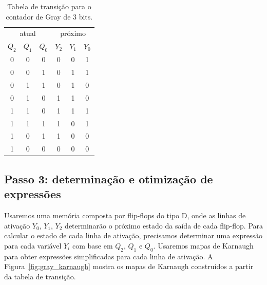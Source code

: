 \documentclass[a4paper]{article}
\begin{document}
\begin{table}[!htp]
\begin{center}
\caption{Tabela de transição para o contador de Gray de $3$ bits.}
\label{tab:gray}
\begin{tabular}{|ccc||ccc|}
\hline
\multicolumn{3}{|c||}{atual} &
\multicolumn{3}{c|}{próximo} \\
$Q_2$ & $Q_1$ & $Q_0$  & $Y_2$ & $Y_1$ & $Y_0$ \\
\hline
  0   &   0   &   0    &   0   &   0   &   1   \\ 
  0   &   0   &   1    &   0   &   1   &   1   \\ 
  0   &   1   &   1    &   0   &   1   &   0   \\ 
  0   &   1   &   0    &   1   &   1   &   0   \\ 
  1   &   1   &   0    &   1   &   1   &   1   \\ 
  1   &   1   &   1    &   1   &   0   &   1   \\ 
  1   &   0   &   1    &   1   &   0   &   0   \\ 
  1   &   0   &   0    &   0   &   0   &   0   \\
\hline
\end{tabular}
\end{center}
\end{table}

\subsection{Passo 3: determinação e otimização de expressões}

Usaremos uma memória composta por flip-flops do tipo D,
onde as linhas de ativação $Y_0$, $Y_1$, $Y_2$ determinarão
o próximo estado da saída de cada flip-flop. Para calcular
o estado de cada linha de ativação, precisamos determinar
uma expressão para cada variável $Y_i$ com base em
$Q_2$, $Q_1$ e $Q_0$. Usaremos mapas de Karnaugh para
obter expressões simplificadas para cada linha de ativação.
A Figura~\ref{fig:gray_karnaugh} mostra os mapas de Karnaugh
construídos a partir da tabela de transição.

\def\GA{\cellcolor{blue!25}}
\def\GB{\cellcolor{red!25}}
\end{document}
